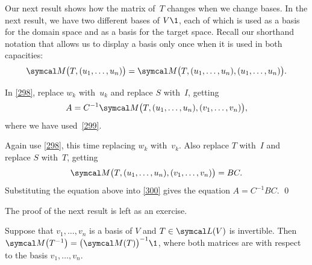Our next result shows how the matrix of~$T$ changes when we change bases. In the next result, we have two different bases of $V\1$, each of which is used as a basis for the domain space and as a basis for the target space. Recall our shorthand notation that allows us to display a basis only once when it is used in both capacities:
\[
\M\bigl(T, (u_1, \dots, u_n)\bigr) = \M\bigl(T, (u_1, \dots, u_n), (u_1, \dots, u_n) \bigr).
\]


\proof
In \ref{298}, replace $w_k$ with~$u_k$ and replace $S$
with~$I$, getting
\begin{equation} \label{300}
A =
C^{-1} \M\bigl(T, (u_1, \dots, u_n), (v_1, \dots, v_n) \bigr),
\end{equation}%
where we have used~\ref{299}.

Again use \ref{298}, this time replacing
$w_k$ with~$v_k$. Also replace $T$
with~$I$ and replace $S$ with~$T$, getting
\[
\M\bigl(T, (u_1, \dots, u_n), (v_1, \dots, v_n) \bigr) = B C.
\]
Substituting the equation above into \ref{300} gives the equation $A = C^{-1}B C$.
\qed

The proof of the next result is left as an exercise.

{Suppose that $v_1, \ldots, v_n$ is a basis of $V$ and $T \in \L(V)$ is invertible. Then
$
\M\bigl(T^{-1}\bigr) = \paren[\big]{\M(T)}^{-1}\1$,
where both matrices are with respect to the basis $v_1, \ldots, v_n$.}

